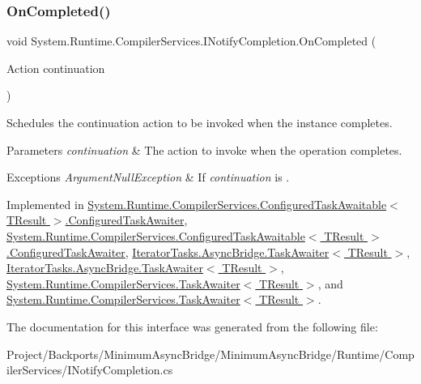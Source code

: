 \subsubsection{\texorpdfstring{On\+Completed()}{OnCompleted()}}
{\footnotesize\ttfamily void System.\+Runtime.\+Compiler\+Services.\+I\+Notify\+Completion.\+On\+Completed (\begin{DoxyParamCaption}\item[{Action}]{continuation }\end{DoxyParamCaption})}



Schedules the continuation action to be invoked when the instance completes.


\begin{DoxyParams}{Parameters}
{\em continuation} & The action to invoke when the operation completes.\\
\hline
\end{DoxyParams}

\begin{DoxyExceptions}{Exceptions}
{\em Argument\+Null\+Exception} & If {\itshape continuation}  is . \\
\hline
\end{DoxyExceptions}


Implemented in \hyperlink{struct_system_1_1_runtime_1_1_compiler_services_1_1_configured_task_awaitable_1_1_configured_task_awaiter_aa2d6d8694d2e2d9a1561e55a70dfd2d7}{System.\+Runtime.\+Compiler\+Services.\+Configured\+Task\+Awaitable$<$ T\+Result $>$.\+Configured\+Task\+Awaiter}, \hyperlink{struct_system_1_1_runtime_1_1_compiler_services_1_1_configured_task_awaitable_1_1_configured_task_awaiter_aa2d6d8694d2e2d9a1561e55a70dfd2d7}{System.\+Runtime.\+Compiler\+Services.\+Configured\+Task\+Awaitable$<$ T\+Result $>$.\+Configured\+Task\+Awaiter}, \hyperlink{struct_iterator_tasks_1_1_async_bridge_1_1_task_awaiter_ab2652fe95760829417ea318260dcde32}{Iterator\+Tasks.\+Async\+Bridge.\+Task\+Awaiter$<$ T\+Result $>$}, \hyperlink{struct_iterator_tasks_1_1_async_bridge_1_1_task_awaiter_ab2652fe95760829417ea318260dcde32}{Iterator\+Tasks.\+Async\+Bridge.\+Task\+Awaiter$<$ T\+Result $>$}, \hyperlink{struct_system_1_1_runtime_1_1_compiler_services_1_1_task_awaiter_a13a4416fccdd08a51279a26e93df88da}{System.\+Runtime.\+Compiler\+Services.\+Task\+Awaiter$<$ T\+Result $>$}, and \hyperlink{struct_system_1_1_runtime_1_1_compiler_services_1_1_task_awaiter_a13a4416fccdd08a51279a26e93df88da}{System.\+Runtime.\+Compiler\+Services.\+Task\+Awaiter$<$ T\+Result $>$}.



The documentation for this interface was generated from the following file\+:\begin{DoxyCompactItemize}
\item 
Project/\+Backports/\+Minimum\+Async\+Bridge/\+Minimum\+Async\+Bridge/\+Runtime/\+Compiler\+Services/I\+Notify\+Completion.\+cs\end{DoxyCompactItemize}
